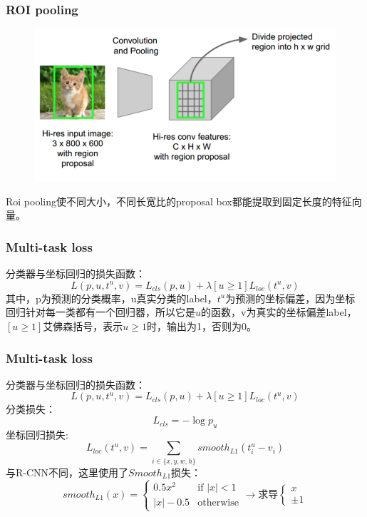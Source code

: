 \documentclass{beamer}
\begin{document}
    \begin{frame}
        \frametitle{ROI pooling}
        \begin{figure}
            \centering
            \includegraphics[width=1.0\textwidth]{../graphic/roipooling6.png}
        \end{figure}
        Roi pooling使不同大小，不同长宽比的proposal box都能提取到固定长度的特征向量。
    \end{frame}
    
    
    \begin{frame}
        \frametitle{Multi-task loss}
        分类器与坐标回归的损失函数：
        $$L(p,u,t^u,v)=L_{cls}(p,u) + \lambda [u\geqslant 1]L_{loc}(t^u,v)$$
        其中，p为预测的分类概率，u真实分类的label，$t^u$为预测的坐标偏差，因为坐标回归针对每一类都有一个回归器，所以它是$u$的函数，v为真实的坐标偏差label，$[u\geqslant 1]$艾佛森括号，表示$u\geqslant 1$时，输出为1，否则为0。
    \end{frame}
    
    \begin{frame}
        \frametitle{Multi-task loss}
        分类器与坐标回归的损失函数：
        $$L(p,u,t^u,v)=L_{cls}(p,u) + \lambda [u\geqslant 1]L_{loc}(t^u,v)$$
        分类损失：
        $$L_{cls}=-\log p_u$$
        坐标回归损失:
        $$L_{loc}(t^u,v)=\sum_{i\in \{x,y,w,h\}}smooth_{L1}(t^u_i-v_i)$$
        与R-CNN不同，这里使用了$Smooth_{L1}$损失：
        $$smooth_{L1}(x) = \begin{cases} 
            0.5x^2 &\text{if }|x| < 1 \\
            |x| - 0.5 &\text{otherwise}\end{cases}  \rightarrow \text{求导}
        \begin{cases} x \\ \pm 1 \end{cases}$$
    \end{frame}
    
\end{document}
